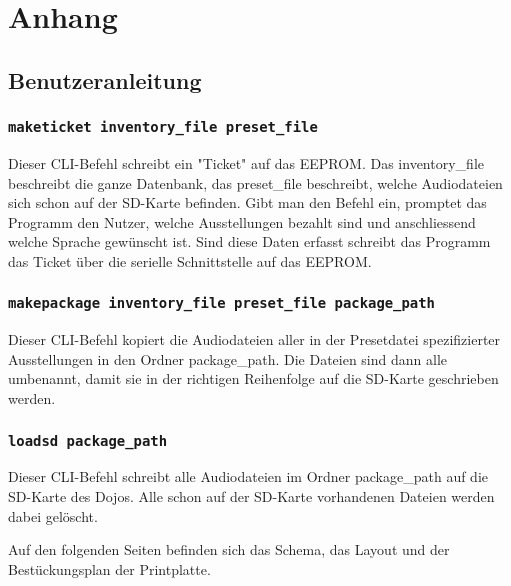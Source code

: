 \chapter{Anhang}
\label{Anhang}
\thispagestyle{fancy}  


\section{Benutzeranleitung}
\subsection{\texttt{maketicket inventory\_file preset\_file}}
Dieser CLI-Befehl schreibt ein "Ticket" auf das EEPROM.
Das inventory\_file beschreibt die ganze Datenbank, 
das preset\_file beschreibt, welche Audiodateien sich schon auf der SD-Karte befinden.
Gibt man den Befehl ein, promptet das Programm den Nutzer, 
welche Ausstellungen bezahlt sind und anschliessend welche Sprache gewünscht ist.
Sind diese Daten erfasst schreibt das Programm das Ticket über die serielle Schnittstelle auf das EEPROM.
\subsection{\texttt{makepackage inventory\_file preset\_file package\_path}}
Dieser CLI-Befehl kopiert die Audiodateien aller in der Presetdatei spezifizierter Ausstellungen in den Ordner package\_path. 
Die Dateien sind dann alle umbenannt, damit sie in der richtigen Reihenfolge auf die SD-Karte geschrieben werden.
\subsection{\texttt{loadsd package\_path}}
Dieser CLI-Befehl schreibt alle Audiodateien im Ordner package\_path auf die SD-Karte des Dojos. Alle schon auf der SD-Karte vorhandenen Dateien werden dabei gelöscht.

\newpage
Auf den folgenden Seiten befinden sich das Schema, das Layout und der Bestückungsplan der Printplatte.


\label{pdf:SchemaSpannungsversorgung}


\label{pdf:SchemaUSB}


\label{pdf:SchemaMikrocontroller}


\label{pdf:BestueckungTop}


\label{pdf:BestueckungBottom}


\label{pdf:LayoutAll}


\label{pdf:LayoutTop}


\label{pdf:LayoutBottom}
